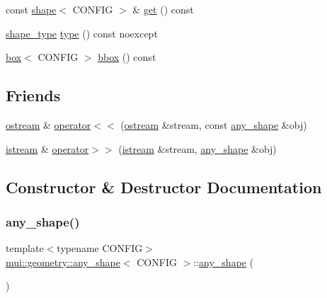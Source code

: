 \begin{DoxyCompactItemize}
\item 
const \hyperlink{classmui_1_1geometry_1_1shape}{shape}$<$ C\+O\+N\+F\+IG $>$ \& \hyperlink{classmui_1_1geometry_1_1any__shape_a9ba06a270236bd9a25207f429b869303}{get} () const
\item 
\hyperlink{namespacemui_1_1geometry_a5f311a343181e2f20482e5c9afb0f136}{shape\+\_\+type} \hyperlink{classmui_1_1geometry_1_1any__shape_adcce217426f80b4a1a17c3659764b607}{type} () const noexcept
\item 
\hyperlink{classmui_1_1geometry_1_1box}{box}$<$ C\+O\+N\+F\+IG $>$ \hyperlink{classmui_1_1geometry_1_1any__shape_ad05e91914ca393723f5651cf57c99775}{bbox} () const
\end{DoxyCompactItemize}
\subsection*{Friends}
\begin{DoxyCompactItemize}
\item 
\hyperlink{classmui_1_1ostream}{ostream} \& \hyperlink{classmui_1_1geometry_1_1any__shape_a3e1a091d6ee6e70e3bd7f3c3e7ae2735}{operator$<$$<$} (\hyperlink{classmui_1_1ostream}{ostream} \&stream, const \hyperlink{classmui_1_1geometry_1_1any__shape}{any\+\_\+shape} \&obj)
\item 
\hyperlink{classmui_1_1istream}{istream} \& \hyperlink{classmui_1_1geometry_1_1any__shape_ab8882ff239d9c3dde4576f36f949e500}{operator$>$$>$} (\hyperlink{classmui_1_1istream}{istream} \&stream, \hyperlink{classmui_1_1geometry_1_1any__shape}{any\+\_\+shape} \&obj)
\end{DoxyCompactItemize}


\subsection{Constructor \& Destructor Documentation}
\mbox{\label{classmui_1_1geometry_1_1any__shape_a63f34ab51f6745f1b004a251ecce6a44}} 
\subsubsection{\texorpdfstring{any\+\_\+shape()}{any\_shape()}\hspace{0.1cm}{\footnotesize\ttfamily [1/4]}}
{\footnotesize\ttfamily template$<$typename C\+O\+N\+F\+IG$>$ \\
\hyperlink{classmui_1_1geometry_1_1any__shape}{mui\+::geometry\+::any\+\_\+shape}$<$ C\+O\+N\+F\+IG $>$\+::\hyperlink{classmui_1_1geometry_1_1any__shape}{any\+\_\+shape} (\begin{DoxyParamCaption}{ }\end{DoxyParamCaption})\hspace{0.3cm}{\ttfamily [default]}}


